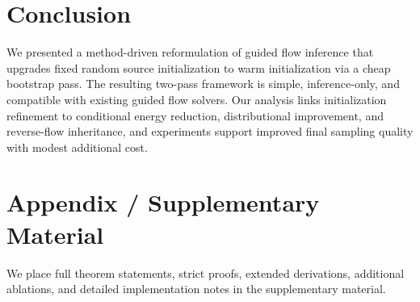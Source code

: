 \documentclass[letterpaper]{article} %
\begin{document}
\section{Conclusion}

We presented a method-driven reformulation of guided flow inference that upgrades fixed random source initialization to warm initialization via a cheap bootstrap pass. The resulting two-pass framework is simple, inference-only, and compatible with existing guided flow solvers. Our analysis links initialization refinement to conditional energy reduction, distributional improvement, and reverse-flow inheritance, and experiments support improved final sampling quality with modest additional cost.



\clearpage
\appendix
\section{Appendix / Supplementary Material}

We place full theorem statements, strict proofs, extended derivations, additional ablations, and detailed implementation notes in the supplementary material.
\end{document}
